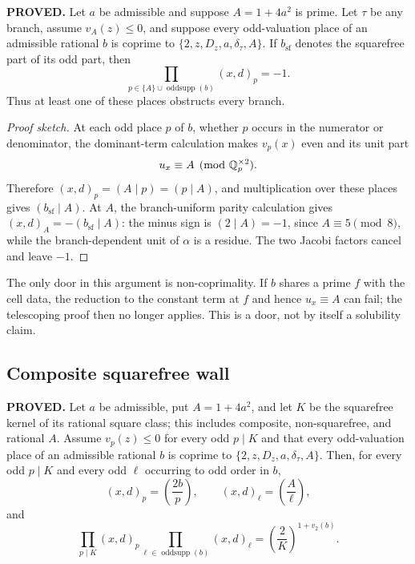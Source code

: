 \begin{theorem}[L12a]
\textbf{PROVED.}  Let $a$ be admissible and suppose $A=1+4a^2$ is
prime.  Let $\tau$ be any branch, assume $v_A(z)\leq0$, and suppose every odd-valuation place of an admissible rational
$b$ is coprime to
$\{2,z,D_z,a,\delta_\tau,A\}$.  If $b_{\mathrm{sf}}$ denotes the
squarefree part of its odd part, then
\[
 \prod_{p\in\{A\}\cup\operatorname{oddsupp}(b)}(x,d)_p=-1.
\]
Thus at least one of these places obstructs every branch.
\end{theorem}

\begin{proof}[Proof sketch]
At each odd place $p$ of $b$, whether $p$ occurs in the numerator or
denominator, the dominant-term calculation makes $v_p(x)$ even and
its unit part
\[
 u_x\equiv A\pmod{\mathbb{Q}_p^{\times2}}.
\]
Therefore $(x,d)_p=(A\mid p)=(p\mid A)$, and multiplication over these
places gives $(b_{\mathrm{sf}}\mid A)$.  At $A$, the branch-uniform
parity calculation gives
$(x,d)_A=-(b_{\mathrm{sf}}\mid A)$: the minus sign is
$(2\mid A)=-1$, since $A\equiv5\pmod8$, while the branch-dependent unit
of $\alpha$ is a residue.  The two Jacobi factors cancel and leave
$-1$.
\end{proof}

The only door in this argument is non-coprimality.  If $b$ shares a
prime $f$ with the cell data, the reduction to the constant term at
$f$ and hence $u_x\equiv A$ can fail; the telescoping proof then no
longer applies.  This is a door, not by itself a solubility claim.

\subsection{Composite squarefree wall}

\begin{theorem}[L13e]
\textbf{PROVED.}  Let $a$ be admissible, put $A=1+4a^2$, and let $K$
be the squarefree kernel of its rational square class; this includes
composite, non-squarefree, and rational $A$.  Assume $v_p(z)\leq0$ for
every odd $p\mid K$ and that every odd-valuation place of an admissible
rational $b$ is coprime to $\{2,z,D_z,a,\delta_\tau,A\}$.  Then, for
every odd $p\mid K$ and every odd $\ell$ occurring to odd order in $b$,
\[
 (x,d)_p=\left(\frac{2b}{p}\right),\qquad
 (x,d)_\ell=\left(\frac{A}{\ell}\right),
\]
and
\[
 \prod_{p\mid K}(x,d)_p
 \prod_{\ell\in\operatorname{oddsupp}(b)}(x,d)_\ell
 =\left(\frac{2}{K}\right)^{1+v_2(b)}.
\]
\end{theorem}

